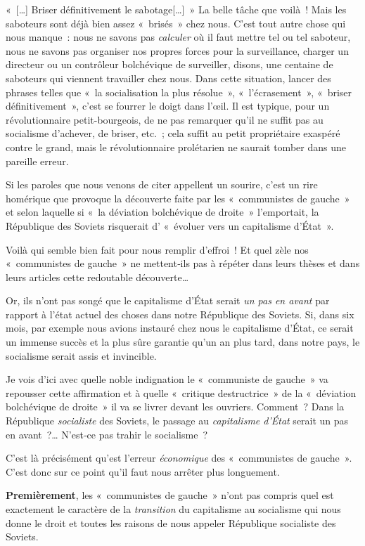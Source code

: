 \documentclass[french,twoside]{book} %
\begin{document}
« […] Briser définitivement le sabotage[…] » La belle tâche que voilà ! Mais les saboteurs sont déjà bien assez « brisés » chez nous. C'est tout autre chose qui nous manque : nous ne savons pas \emph{calculer} où il faut mettre tel ou tel saboteur, nous ne savons pas organiser nos propres forces pour la surveillance, charger un directeur ou un contrôleur bolchévique de surveiller, disons, une centaine de saboteurs qui viennent travailler chez nous. Dans cette situation, lancer des phrases telles que « la socialisation la plus résolue », « l’écrasement », « briser définitivement », c’est se fourrer le doigt dans l’œil. Il est typique, pour un révolutionnaire petit-­bourgeois, de ne pas remarquer qu’il ne suffit pas au socialisme d’achever, de briser, etc. ; cela suffit au petit propriétaire exaspéré contre le grand, mais le révolutionnaire prolétarien ne saurait tomber dans une pareille erreur.\par
Si les paroles que nous venons de citer appellent un sou­rire, c’est un rire homérique que provoque la découverte faite par les « communistes de gauche » et selon laquelle si « la déviation bolchévique de droite » l’emportait, la République des Soviets risquerait d’ « évoluer vers un capita­lisme d’État ».\par
Voilà qui semble bien fait pour nous rem­plir d’effroi ! Et quel zèle nos « communistes de gauche » ne mettent‑ils pas à répéter dans leurs thèses et dans leurs articles cette redoutable découverte…\par
Or, ils n’ont pas songé que le capitalisme d’État serait \emph{un pas en avant} par rapport à l’état actuel des choses dans notre République des Soviets. Si, dans six mois, par exemple nous avions instauré chez nous le capitalisme d’État, ce serait un immense succès et la plus sûre garantie qu’un an plus tard, dans notre pays, le socialisme serait assis et invincible.\par
Je vois d’ici avec quelle noble indignation le « commu­niste de gauche » va repousser cette affirmation et à quelle « critique destructrice » de la « déviation bolchévique de droite » il va se livrer devant les ouvriers. Comment ? Dans la République \emph{socialiste} des Soviets, le passage au \emph{capitalisme d’État} serait un pas en avant ?… N'est‑ce pas trahir le socialisme ?\par
C’est là précisément qu’est l’erreur \emph{économique} des « communistes de gauche ». C'est donc sur ce point qu’il faut nous arrêter plus longuement.\par
\textbf{Premièrement}, les « communistes de gauche » n’ont pas compris quel est exactement le caractère de la \emph{transition} du capitalisme au socialisme qui nous donne le droit et toutes les raisons de nous appeler République socialiste des Soviets.\par
\end{document}
